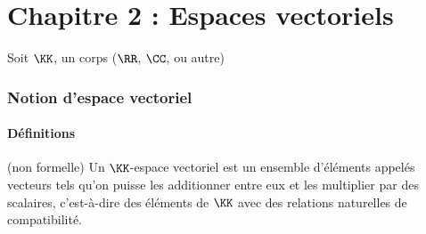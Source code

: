 \documentclass[../main.tex]{subfile}
\begin{document}
\part{Chapitre 2 : Espaces vectoriels}
Soit $\KK$, un corps ($\RR$, $\CC$, ou autre)

\section{Notion d'espace vectoriel}
\subsection{Définitions}
\begin{defi}{(non formelle)}
	Un $\KK$-espace vectoriel est un ensemble d'éléments appelés vecteurs 
	tels qu'on puisse les additionner entre eux et les multiplier par des scalaires, 
	c'est-à-dire des éléments de $\KK$ avec des relations naturelles de compatibilité.
\end{defi}
\end{document}
